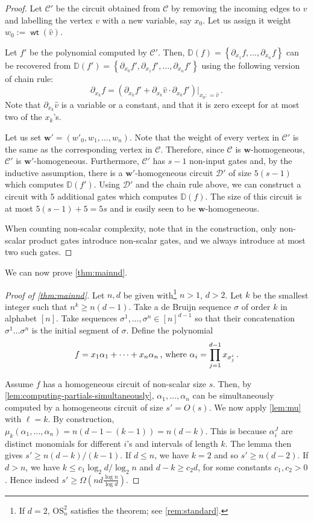 \documentclass[10pt,a4paper]{article}
\def\set#1{\left\{ #1 \right\}}
\def\vecw{\mathbf{w}}
\newcommand{\ckt}{\textbf{$\mathcal{C}$}}
\newcommand{\wt}{\operatorname{\mathsf{wt}}}
\newcommand{\esym}[2]{\mathrm{OS}_{#1}^{#2}}
\begin{document}
\begin{proof}
  Let $\ckt'$ be the circuit obtained from $\ckt$ by removing the incoming edges to $v$ and labelling the vertex $v$ with a new variable, say $x_0$. 
  Let us assign it weight $w_0:=\wt(\widehat {v})$.
  
  Let $f'$ be the polynomial computed by $\ckt'$.
  Then, $\mathbb{D}(f) = \set{\partial_{ x_1}f, \ldots, \partial_{ x_n}f}$ can be recovered from $\mathbb{D}(f') = \set{\partial_{ x_0}f', \partial_{ x_1}f', \ldots, \partial_{ x_n}f'}$ using the following version of chain rule:
  \[ 
    \partial_{x_k}f = (\partial_{x_k}f'+ \partial_{x_k}\widehat {v}\cdot  \partial_{x_0}f')|_{x_0: = \widehat {v}}\,. 
  \]
  Note that $\partial_{x_k}\widehat{v}$ is a variable or a constant, and that it is zero except for at most two of the $x_k$'s.

  Let us set $\vecw' = (w'_0, w_1, \ldots, w_n)$.
  Note that the weight of every vertex in $\ckt'$ is the same as the corresponding vertex in $\ckt$.
  Therefore, since $\ckt$ is $\vecw$-homogeneous, $\ckt'$ is $\vecw'$-homogeneous.
  Furthermore, $\ckt'$ has $s-1$ non-input gates and, by the inductive assumption, there is a $\vecw'$-homogeneous circuit $\mathcal{D}'$ of size $5(s-1)$ which computes $\mathbb{D}(f')$.
  Using $\mathcal{D}'$ and the chain rule above, we can construct a circuit with $5$ additional gates which computes $\mathbb{D}(f)$.
  The size of this circuit is at most $5(s-1) + 5 = 5s$ and is easily seen to be $\vecw$-homogeneous. 
  
  When counting non-scalar complexity, note that in the construction, only non-scalar product gates introduce non-scalar gates, and we always introduce at most two such gates.    
\end{proof}

We can now prove \autoref{thm:mainnd}. 

\begin{proof}[Proof of \autoref{thm:mainnd}] 
  Let $n,d$ be given with\footnote{If $d= 2$, $\esym{n}{2}$ satisfies the theorem; see \autoref{rem:standard}.} $n>1$, $d>2$. 
  Let $k$ be the smallest integer such that $n^k\geq n(d-1)$. Take a de Bruijn sequence $\sigma$ of order $k$ in alphabet $[n]$. 
  Take sequences $\sigma^1,\dots,\sigma^n\in [n]^{d-1}$ so that their concatenation $\sigma^1\dots \sigma^n$ is the initial segment of $\sigma$. 
  Define the polynomial 
  \[ 
    f= x_1\alpha_1+\dots+x_n\alpha_n\, \hbox{, where  }\alpha_i= \prod_{j=1}^{d-1}x_{\sigma^i_j} \,.
  \]

  Assume $f$ has a homogeneous circuit of non-scalar size $s$. 
  Then, by \autoref{lem:computing-partials-simultaneously}, $\alpha_1,\dots,\alpha_n$ can be simultaneously computed by a homogeneous circuit of size $s'=O(s)$. 
  We now apply \autoref{lem:mu} with $\ell=k$. 
  By construction, $\mu_k(\alpha_1,\dots, \alpha_n)= n(d-1- (k-1))=n(d-k)$. 
  This is because $\alpha_i^J$ are distinct monomials for different $i$'s and intervals of length $k$. 
  The lemma then gives $s'\geq n(d-k)/(k-1)$. 
  If $d\leq n$, we have $k=2$ and so $s'\geq n(d-2)$.  
  If $d>n$, we have $k\leq c_1 \log_2d/\log_2n$ and $d-k\geq c_2 d$, for some constants $c_1,c_2>0$.  
  Hence indeed $s'\geq \Omega(nd\frac{\log n }{\log d})$. 
\end{proof}
\end{document}
